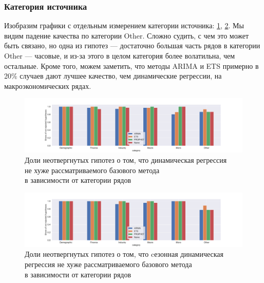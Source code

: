 \documentclass[a4paper,14pt]{extarticle}
\begin{document}
	\subsubsection{Категория источника}
	Изобразим графики с отдельным измерением категории источника: \ref{results:dynreg:category}, \ref{results:seasdynreg:category}. Мы видим падение качества по категории Other. Сложно судить, с чем это может быть связано, но одна из гипотез --- достаточно большая часть рядов в категории Other --- часовые, и из-за этого в целом категория более волатильна, чем остальные. Кроме того, можем заметить, что методы ARIMA и ETS примерно в 20\% случаев дают лучшее качество, чем динамические регрессии, на макроэкономических рядах.
	\begin{figure}[!h]
		\captionsetup{justification=centering}
		\centering
		\includegraphics[width=\linewidth]{pictures/results-dynreg-category.pdf}
		\caption{Доли неотвергнутых гипотез о том, что динамическая регрессия \\ не хуже рассматриваемого базового метода \\ в зависимости от категории рядов}
		\label{results:dynreg:category}
	\end{figure}
	\begin{figure}[!h]
		\captionsetup{justification=centering}
		\centering
		\includegraphics[width=\linewidth]{pictures/results-seasdynreg-category.pdf}
		\caption{Доли неотвергнутых гипотез о том, что cезонная динамическая регрессия не хуже рассматриваемого базового метода \\ в зависимости от категории рядов}
		\label{results:seasdynreg:category}
	\end{figure}
\end{document}
